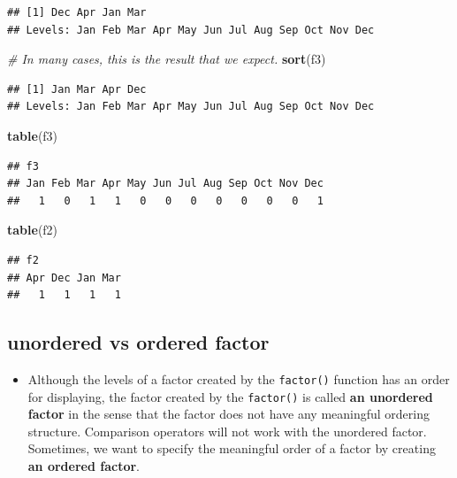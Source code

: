 \documentclass[]{book}
\newenvironment{Shaded}{\begin{snugshade}}{\end{snugshade}}
\newcommand{\CommentTok}[1]{\textcolor[rgb]{0.56,0.35,0.01}{\textit{#1}}}
\newcommand{\KeywordTok}[1]{\textcolor[rgb]{0.13,0.29,0.53}{\textbf{#1}}}
\newcommand{\NormalTok}[1]{#1}
\providecommand{\tightlist}{%
  \setlength{\itemsep}{0pt}\setlength{\parskip}{0pt}}
\begin{document}
\begin{verbatim}
## [1] Dec Apr Jan Mar
## Levels: Jan Feb Mar Apr May Jun Jul Aug Sep Oct Nov Dec
\end{verbatim}

\begin{Shaded}
\begin{Highlighting}[]
\CommentTok{# In many cases, this is the result that we expect. }
\KeywordTok{sort}\NormalTok{(f3)}
\end{Highlighting}
\end{Shaded}

\begin{verbatim}
## [1] Jan Mar Apr Dec
## Levels: Jan Feb Mar Apr May Jun Jul Aug Sep Oct Nov Dec
\end{verbatim}

\begin{Shaded}
\begin{Highlighting}[]
\KeywordTok{table}\NormalTok{(f3)}
\end{Highlighting}
\end{Shaded}

\begin{verbatim}
## f3
## Jan Feb Mar Apr May Jun Jul Aug Sep Oct Nov Dec 
##   1   0   1   1   0   0   0   0   0   0   0   1
\end{verbatim}

\begin{Shaded}
\begin{Highlighting}[]
\KeywordTok{table}\NormalTok{(f2)}
\end{Highlighting}
\end{Shaded}

\begin{verbatim}
## f2
## Apr Dec Jan Mar 
##   1   1   1   1
\end{verbatim}

\hypertarget{unordered-vs-ordered-factor}{%
\subsection{unordered vs ordered factor}\label{unordered-vs-ordered-factor}}

\begin{itemize}
\tightlist
\item
  Although the levels of a factor created by the \texttt{factor()} function has an order for displaying, the factor created by the \texttt{factor()} is called \textbf{an unordered factor} in the sense that the factor does not have any meaningful ordering structure. Comparison operators will not work with the unordered factor. Sometimes, we want to specify the meaningful order of a factor by creating \textbf{an ordered factor}.
\end{itemize}
\end{document}
